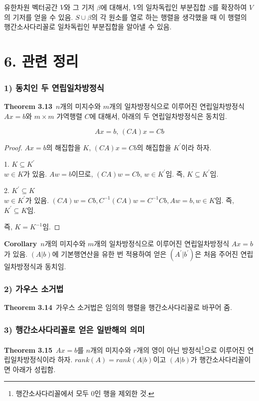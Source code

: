 유한차원 벡터공간 $V$와 그 기저 $\beta$에 대해서, $V$의 일차독립인 부분집합 $S$를 확장하여 $V$의 기저를 얻을 수 있음. $S \cup \beta$의 각 원소를 열로 하는 행렬을 생각했을 때 이 행렬의 행간소사다리꼴로 일차독립인 부분집합을 알아낼 수 있음.


\newpage


\section*{6. 관련 정리}
\subsubsection*{1) 동치인 두 연립일차방정식}
\textbf{Theorem 3.13}\, $n$개의 미지수와 $m$개의 일차방정식으로 이루어진 연립일차방정식 $Ax=b$와 $m \times m$ 갸역행렬 $C$에 대해서, 아래의 두 연립일차방정식은 동치임.

\[
Ax=b,\,(CA)x=Cb
\]

\begin{proof}
$Ax=b$의 해집합을 $K$, $(CA)x=Cb$의 해집합을 $K^{\prime}$이라 하자.

1. $K \subseteq K^{\prime}$\\
$w \in K$가 있음. $Aw=b$이므로, $(CA)w=Cb$, $w \in K^{\prime}$임. 즉, $K \subseteq K^{\prime}$임.

2. $K^{\prime} \subseteq K$\\
$w \in K^{\prime}$가 있음. $(CA)w=Cb, C^{-1}(CA)w=C^{-1}Cb, Aw=b, w \in K$임. 즉, $K^{\prime} \subseteq K$임.

즉, $K=K^{-1}$임.
\end{proof}

\textbf{Corollary}\, $n$개의 미지수와 $m$개의 일차방정식으로 이루어진 연립일차방정식 $Ax=b$가 있음. $(A|b)$에 기본행연산을 유한 번 적용하여 얻은 $(A^{\prime}|b^{\prime})$은 처음 주어진 연립일차방정식과 동치임.

\subsubsection*{2) 가우스 소거법}
\textbf{Theorem 3.14}\, 가우스 소거법은 임의의 행렬을 행간소사다리꼴로 바꾸어 줌.

\subsubsection*{3) 행간소사다리꼴로 얻은 일반해의 의미}
\textbf{Theorem 3.15}\, $Ax=b$를 $n$개의 미지수와 $r$개의 영이 아닌 방정식\footnote{행간소사다리꼴에서 모두 0인 행을 제외한 것.}으로 이루어진 연립일차방정식이라 하자. $rank(A)=rank(A|b)$이고 $(A|b)$가 행간소사다리꼴이면 아래가 성립함.

